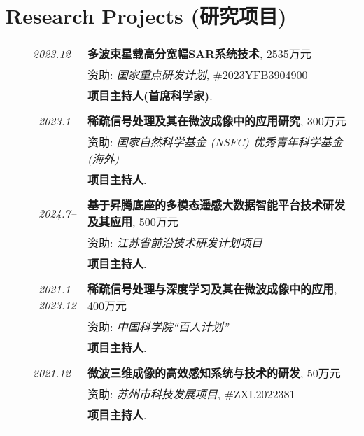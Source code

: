 \documentclass[paper=a4,fontsize=11pt]{scrartcl}
\begin{document}
\section*{Research Projects (研究项目)}

\begin{longtable}{r|p{12cm}}
	
	\emph{2023.12--} & \textbf{多波束星载高分宽幅SAR系统技术}, 2535万元 \\
	& 资助: \emph{国家重点研发计划}, \#2023YFB3904900\\
	& \textbf{项目主持人(首席科学家)}.\\
	\multicolumn{2}{c}{} \\
	
	\emph{2023.1--} & \textbf{稀疏信号处理及其在微波成像中的应用研究}, 300万元 \\
	& 资助: \emph{国家自然科学基金 (NSFC) 优秀青年科学基金 (海外)}\\
	& \textbf{项目主持人}.\\
	\multicolumn{2}{c}{} \\
	
	\emph{2024.7--} & \textbf{基于昇腾底座的多模态遥感大数据智能平台技术研发及其应用}, 500万元 \\
	& 资助: \emph{江苏省前沿技术研发计划项目}\\
	& \textbf{项目主持人}.\\
	\multicolumn{2}{c}{} \\
	
	\emph{2021.1--2023.12} & \textbf{稀疏信号处理与深度学习及其在微波成像中的应用}, 400万元 \\
	& 资助: \emph{中国科学院``百人计划''}\\
	& \textbf{项目主持人}.\\
	\multicolumn{2}{c}{} \\
	
	\emph{2021.12--} & \textbf{微波三维成像的高效感知系统与技术的研发}, 50万元 \\
	& 资助: \emph{苏州市科技发展项目}, \#ZXL2022381\\
	& \textbf{项目主持人}.\\
	\multicolumn{2}{c}{} \\
	

\end{longtable}
\end{document}
